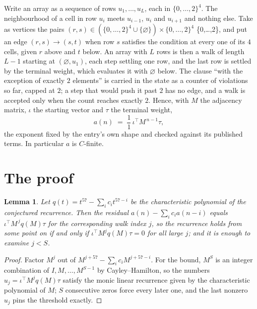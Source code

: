 \documentclass[11pt,a4paper]{article}
\theoremstyle{plain}
\newtheorem{lemma}[theorem]{Lemma}
\theoremstyle{definition}
\begin{document}
Write an array as a sequence of rows $u_1,\dots,u_L$, each in
$\{0,\dots,2\}^{4}$. The neighbourhood of a cell in row $u_i$ meets $u_{i-1}$,
$u_i$ and $u_{i+1}$ and nothing else. Take as vertices the pairs
$(r,s)\in(\{0,\dots,2\}^{4}\cup\{\varnothing\})\times\{0,\dots,2\}^{4}$ \times \{0,\dots,2\},
and put an edge $(r,s)\to(s,t)$ when row $s$ satisfies the condition at every one of its
$4$ cells, given $r$ above and $t$ below. An array with $L$ rows is then a walk of length
$L-1$ starting at $(\varnothing,u_1)$, each step settling one row, and the last row is
settled by the terminal weight, which evaluates it with $\varnothing$ below. The clause ``with the exception of exactly $2$ elements'' is carried in
the state as a counter of violations so far, capped at $2$; a step that would push it past
$2$ has no edge, and a walk is accepted only when the count reaches exactly $2$. Hence,
with $M$ the adjacency matrix, $\iota$ the starting vector and $\tau$ the terminal weight,
\[
a(n)\;=\;\frac{1}{1}\,\iota^{\!\top}M^{\,n-1}\tau ,
\]
the exponent fixed by the entry's own shape and checked against its published terms. In
particular $a$ is $C$-finite.

\section{The proof}

\begin{lemma}\label{lem:crit}
Let $q(t)=t^{57}-\sum_i c_it^{57-i}$ be the characteristic polynomial of the
conjectured recurrence. Then the residual $a(n)-\sum_ic_ia(n-i)$ equals
$\iota^{\!\top}M^{\,j}q(M)\tau$ for the corresponding walk index $j$, so the
recurrence holds from some point on if and only if $\iota^{\!\top}M^{j}q(M)\tau=0$ for all
large $j$; and it is enough to examine $j<S$.
\end{lemma}

\begin{proof}
Factor $M^{j}$ out of $M^{j+57}-\sum_ic_iM^{j+57-i}$. For the bound, $M^{S}$
is an integer combination of $I,M,\dots,M^{S-1}$ by Cayley--Hamilton, so the numbers
$u_j=\iota^{\!\top}M^{j}q(M)\tau$ satisfy the monic linear recurrence given by the
characteristic polynomial of $M$; $S$ consecutive zeros force every later one, and the last
nonzero $u_j$ pins the threshold exactly.
\end{proof}
\end{document}
